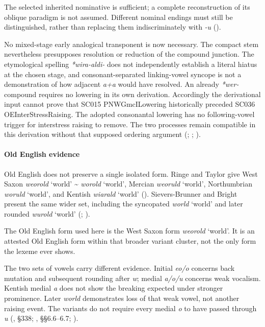 \documentclass[
  british,
  a4paper,
]{article}
\begin{document}
The selected inherited nominative is sufficient; a complete
reconstruction of its oblique paradigm is not assumed. Different nominal
endings must still be distinguished, rather than replacing them
indiscriminately with \emph{-u} ().

No mixed-stage early analogical transponent is now necessary. The
compact stem nevertheless presupposes resolution or reduction of the
compound junction. The etymological spelling \emph{*wira-aldi-} does not
independently establish a literal hiatus at the chosen stage, and
consonant-separated linking-vowel syncope is not a demonstration of how
adjacent \emph{a+a} would have resolved. An already \emph{*wer-}
compound requires no lowering in its own derivation. Accordingly the
derivational input cannot prove that SC015 PNWGmcILowering historically
preceded SC036 OEInterStressRaising. The adopted consonantal lowering
has no following-vowel trigger for interstress raising to remove. The
two processes remain compatible in this derivation without that supposed
ordering argument (;
;
).

\paragraph{Old English evidence}\label{old-english-evidence-84}

Old English does not preserve a single isolated form. Ringe and Taylor
give West Saxon {\emph{weorold}} `world' \textasciitilde{}
{\emph{worold}} `world', Mercian {\emph{weoruld}} `world', Northumbrian
{\emph{woruld}} `world', and Kentish {\emph{wiarald}} `world'
().
Sievers-Brunner and Bright present the same wider set, including the
syncopated {\emph{world}} `world' and later rounded {\emph{wurold}}
`world' (;
).

The Old English form used here is the West Saxon form {\emph{weorold}}
`world'. It is an attested Old English form within that broader variant
cluster, not the only form the lexeme ever shows.

The two sets of vowels carry different evidence. Initial \emph{eo/o}
concerns back mutation and subsequent rounding after \emph{w}; medial
\emph{a/o/u} concerns weak vocalism. Kentish medial \emph{a} does not
show the breaking expected under stronger prominence. Later \emph{world}
demonstrates loss of that weak vowel, not another raising event. The
variants do not require every medial \emph{o} to have passed through
\emph{u} (, §338;
, §§6.6--6.7;
).
\end{document}
